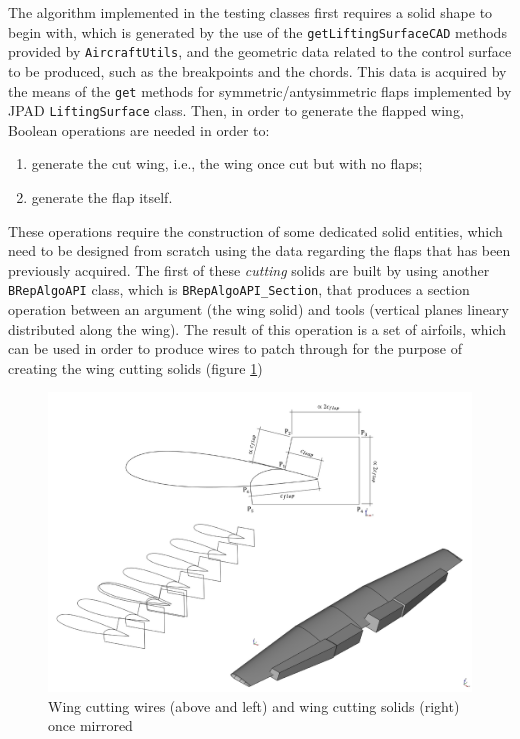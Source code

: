 \bigskip
\noindent
The algorithm implemented in the testing classes first requires a solid shape to begin with, which is generated by the use of the \lstinline[language=Java]!getLiftingSurfaceCAD! methods provided by \lstinline[language=Java]!AircraftUtils!, and the geometric data related to the control surface to be produced, such as the breakpoints and the chords. This data is acquired by the means of the \lstinline[language=Java]!get! methods for symmetric/antysimmetric flaps implemented by  \gls{JPAD} \lstinline[language=Java]!LiftingSurface! class. Then, in order to generate the flapped wing, Boolean operations are needed in order to:
%
\begin{enumerate}
\item generate the cut wing, i.e., the wing once cut but with no flaps;
\item generate the flap itself.
\end{enumerate}
%
These operations require the construction of some dedicated solid entities, which need to be designed from scratch using the data regarding the flaps that has been previously acquired. The first of these \emph{cutting} solids are built by using another \lstinline[language=Java]!BRepAlgoAPI! class, which is \lstinline[language=Java]!BRepAlgoAPI_Section!, that produces a section operation between an argument (the wing solid) and tools (vertical planes lineary distributed along the wing). The result of this operation is a set of airfoils, which can be used in order to produce wires to patch through for the purpose of creating the wing cutting solids (figure \ref{fig:WingCuttingWiresPlusSolid})
%
\begin{figure}[H]
\centering
\includegraphics[scale=0.42]{Immagini/Appendice/Flap/flap_05}
\caption{Wing cutting wires (above and left) and wing cutting solids (right) once mirrored}
\label{fig:WingCuttingWiresPlusSolid}
\end{figure}
%  

